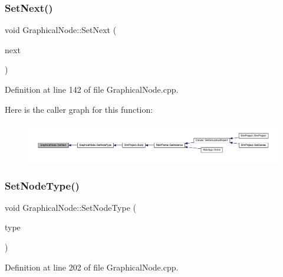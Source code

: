 \subsubsection{\texorpdfstring{Set\+Next()}{SetNext()}}
{\footnotesize\ttfamily void Graphical\+Node\+::\+Set\+Next (\begin{DoxyParamCaption}\item[{\hyperlink{class_graphical_node}{Graphical\+Node} $\ast$}]{next }\end{DoxyParamCaption})}



Definition at line 142 of file Graphical\+Node.\+cpp.

Here is the caller graph for this function\+:
\nopagebreak
\begin{figure}[H]
\begin{center}
\leavevmode
\includegraphics[width=350pt]{class_graphical_node_a036c1cc48701511037e50bc74fd8d430_icgraph}
\end{center}
\end{figure}
\mbox{\label{class_graphical_node_a2be01228b0d5b17f1d14038aeee25619}} 
\subsubsection{\texorpdfstring{Set\+Node\+Type()}{SetNodeType()}}
{\footnotesize\ttfamily void Graphical\+Node\+::\+Set\+Node\+Type (\begin{DoxyParamCaption}\item[{\hyperlink{class_generic_node_a9e7985ab9bbfa1c85091adc0ab71a6b6}{Generic\+Node\+::\+Type}}]{type }\end{DoxyParamCaption})}



Definition at line 202 of file Graphical\+Node.\+cpp.

